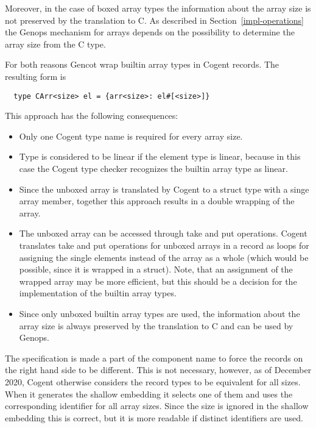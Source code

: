 Moreover, in the case of boxed array types  the information about the array size  is not 
preserved by the translation to C. As described in Section~\ref{impl-operations} the Genops mechanism for arrays 
depends on the possibility to determine the array size from the C type. 

For both reasons Gencot wrap builtin array types in Cogent records. The resulting form is
\begin{verbatim}
  type CArr<size> el = {arr<size>: el#[<size>]}
\end{verbatim}
This approach has the following consequences:
\begin{itemize}
\item Only one Cogent type name is required for every array size.
\item Type  is considered to be linear if the element type  is linear,
because in this case the Cogent type checker recognizes the builtin array type  as linear.
\item Since the unboxed array is translated by Cogent to a struct type with a singe array member, together this
approach results in a double wrapping of the array.
\item The unboxed array can be accessed through take and put operations. Cogent translates take and put operations for unboxed arrays
in a record as loops for assigning the single elements instead of the array as a whole (which would be possible, since it is
wrapped in a struct). Note, that an assignment of the wrapped array may be more efficient, but this should be a decision for the 
implementation of the builtin array types.
\item Since only unboxed builtin array types are used, the information about the array size is always preserved
by the translation to C and can be used by Genops.
\end{itemize}

The  specification is made a part of the component name  to force the records on the 
right hand side to be different. This is not necessary, however, as of December 2020, Cogent otherwise considers the record types
to be equivalent for all sizes. When it generates the shallow embedding it selects one of them and uses the corresponding 
identifier  for all array sizes. Since the size is ignored in the shallow embedding this is correct, but it
is more readable if distinct identifiers are used.

